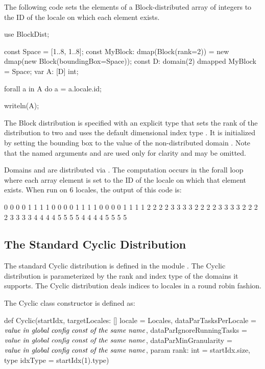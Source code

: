 \begin{example}
The following code sets the elements of a Block-distributed array of
integers to the ID of the locale on which each element exists.
\begin{chapel}
use BlockDist;

const Space = [1..8, 1..8];
const MyBlock: dmap(Block(rank=2)) = new dmap(new Block(boundingBox=Space));
const D: domain(2) dmapped MyBlock = Space;
var A: [D] int;

forall a in A do
  a = a.locale.id;

writeln(A);
\end{chapel}
The Block distribution  is specified with an explicit
type that sets the rank of the distribution to two and uses the
default dimensional index type .  It is initialized by
setting the bounding box to the value of the non-distributed domain
.  Note that the named arguments  and
 are used only for clarity and may be omitted.

Domains  and  are distributed via .  The
computation occurs in the forall loop where each array element is set
to the ID of the locale on which that element exists.  When run on 6
locales, the output of this code is:
\begin{chapel}
0 0 0 0 1 1 1 1
0 0 0 0 1 1 1 1
0 0 0 0 1 1 1 1
2 2 2 2 3 3 3 3
2 2 2 2 3 3 3 3
2 2 2 2 3 3 3 3
4 4 4 4 5 5 5 5
4 4 4 4 5 5 5 5
\end{chapel}
\end{example}

\subsection{The Standard Cyclic Distribution}
\label{Cyclic_Dist}
The standard Cyclic distribution is defined in the module .
The Cyclic distribution is parameterized by the rank and index type of
the domains it supports. The Cyclic distribution deals indices to locales
in a round robin fashion.

The Cyclic class constructor is defined as:
\begin{chapel}
def Cyclic(startIdx,
           targetLocales: [] locale = Locales,
           dataParTasksPerLocale = $\mbox{{\it value in global config const of the same name}}$,
           dataParIgnoreRunningTasks = $\mbox{{\it value in global config const of the same name}}$,
           dataParMinGranularity = $\mbox{{\it value in global config const of the same name}}$,
           param rank: int = startIdx.size,
           type idxType = startIdx(1).type)
\end{chapel}

